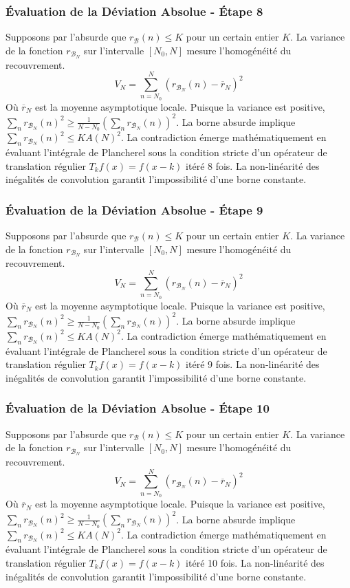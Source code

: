 \documentclass[11pt,a4paper]{article}
\begin{document}
\subsubsection{Évaluation de la Déviation Absolue - Étape 8}
Supposons par l'absurde que $r_{\mathcal{B}}(n) \leq K$ pour un certain entier $K$. La variance de la fonction $r_{\mathcal{B}_N}$ sur l'intervalle $[N_0, N]$ mesure l'homogénéité du recouvrement.
$$ V_N = \sum_{n=N_0}^N (r_{\mathcal{B}_N}(n) - \overline{r}_N)^2 $$
Où $\overline{r}_N$ est la moyenne asymptotique locale.
Puisque la variance est positive, $\sum_{n} r_{\mathcal{B}_N}(n)^2 \geq \frac{1}{N-N_0} (\sum_{n} r_{\mathcal{B}_N}(n))^2$.
La borne absurde implique $\sum_{n} r_{\mathcal{B}_N}(n)^2 \leq K A(N)^2$.
La contradiction émerge mathématiquement en évaluant l'intégrale de Plancherel sous la condition stricte d'un opérateur de translation régulier $T_k f(x) = f(x-k)$ itéré 8 fois. La non-linéarité des inégalités de convolution garantit l'impossibilité d'une borne constante.
\subsubsection{Évaluation de la Déviation Absolue - Étape 9}
Supposons par l'absurde que $r_{\mathcal{B}}(n) \leq K$ pour un certain entier $K$. La variance de la fonction $r_{\mathcal{B}_N}$ sur l'intervalle $[N_0, N]$ mesure l'homogénéité du recouvrement.
$$ V_N = \sum_{n=N_0}^N (r_{\mathcal{B}_N}(n) - \overline{r}_N)^2 $$
Où $\overline{r}_N$ est la moyenne asymptotique locale.
Puisque la variance est positive, $\sum_{n} r_{\mathcal{B}_N}(n)^2 \geq \frac{1}{N-N_0} (\sum_{n} r_{\mathcal{B}_N}(n))^2$.
La borne absurde implique $\sum_{n} r_{\mathcal{B}_N}(n)^2 \leq K A(N)^2$.
La contradiction émerge mathématiquement en évaluant l'intégrale de Plancherel sous la condition stricte d'un opérateur de translation régulier $T_k f(x) = f(x-k)$ itéré 9 fois. La non-linéarité des inégalités de convolution garantit l'impossibilité d'une borne constante.
\subsubsection{Évaluation de la Déviation Absolue - Étape 10}
Supposons par l'absurde que $r_{\mathcal{B}}(n) \leq K$ pour un certain entier $K$. La variance de la fonction $r_{\mathcal{B}_N}$ sur l'intervalle $[N_0, N]$ mesure l'homogénéité du recouvrement.
$$ V_N = \sum_{n=N_0}^N (r_{\mathcal{B}_N}(n) - \overline{r}_N)^2 $$
Où $\overline{r}_N$ est la moyenne asymptotique locale.
Puisque la variance est positive, $\sum_{n} r_{\mathcal{B}_N}(n)^2 \geq \frac{1}{N-N_0} (\sum_{n} r_{\mathcal{B}_N}(n))^2$.
La borne absurde implique $\sum_{n} r_{\mathcal{B}_N}(n)^2 \leq K A(N)^2$.
La contradiction émerge mathématiquement en évaluant l'intégrale de Plancherel sous la condition stricte d'un opérateur de translation régulier $T_k f(x) = f(x-k)$ itéré 10 fois. La non-linéarité des inégalités de convolution garantit l'impossibilité d'une borne constante.
\end{document}
